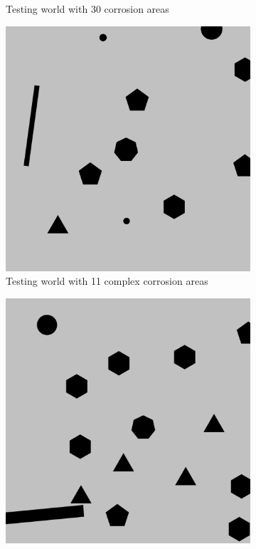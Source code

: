 \documentclass[francais,RandD]{rapportPFE}
\begin{document}
\begin{figure}[H]
\begin{subfigure}[t]{0.15\linewidth}
				\caption{Testing world with 30 corrosion areas}
				\label{fig:test_model_30_1}
			\end{subfigure}
			\hfill
			\begin{subfigure}[t]{0.15\linewidth}
					\includegraphics[width=\linewidth]{graphics/test_model_11_complex_1.png}
					\caption{Testing world with 11 complex corrosion areas}
					\label{fig:test_model_11_complex_1}
			\end{subfigure}
			\hfill
			\begin{subfigure}[t]{0.15\linewidth}
				\centering
				\includegraphics[width=\linewidth]{graphics/test_model_15_complex_1.png}

\end{subfigure}
\end{figure}
\end{document}
